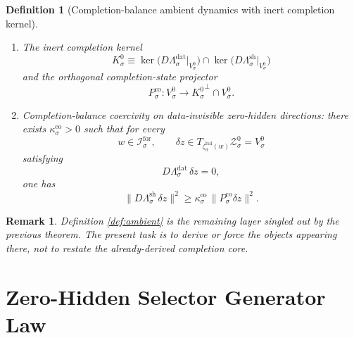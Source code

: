 \documentclass[11pt]{article}
\newcommand{\ForSpace}[1]{\mathcal I_{#1}^{\mathrm{for}}}
\newcommand{\BalBody}[1]{\mathcal B_{#1}^{\mathrm{bal}}}
\newcommand{\BalData}[1]{\Lambda_{#1}^{\mathrm{dat}}}
\newcommand{\BalShell}[1]{\Lambda_{#1}^{\mathrm{sh}}}
\newcommand{\ZeroHiddenSlice}[1]{\mathcal Z_{#1}^{0}}
\newcommand{\ZeroHiddenVec}[1]{V_{#1}^{0}}
\newcommand{\Kernel}[1]{K_{#1}^{0}}
\newcommand{\BalEmbed}[1]{\zeta_{#1}^{\mathrm{bal}}}
\newcommand{\StateComp}[1]{P_{#1}^{\mathrm{co}}}
\newtheorem{definition}{Definition}
\newtheorem{remark}{Remark}
\begin{document}
\begin{definition}[Completion-balance ambient dynamics with inert completion kernel]
\begin{enumerate}
\begin{equation}
    \BalBody{\sigma}\cap\ZeroHiddenSlice{\sigma}
    \bigr)
    =
    \BalData{\sigma}\Bigl(
    \BalBody{\sigma}\cap
    \ZeroHiddenSlice{\sigma}\cap
    \bigl(\BalShell{\sigma}\bigr)^{-1}(0)
    \Bigr).
    \label{eq:ambientsolvability}
    \end{equation}
    \item The inert completion kernel
    \[
    \Kernel{\sigma}
    \equiv
    \ker\bigl(D\BalData{\sigma}\big|_{\ZeroHiddenVec{\sigma}}\bigr)
    \cap
    \ker\bigl(D\BalShell{\sigma}\big|_{\ZeroHiddenVec{\sigma}}\bigr)
    \]
    and the orthogonal completion-state projector
    \[
    \StateComp{\sigma}:
    \ZeroHiddenVec{\sigma}\to
    {\Kernel{\sigma}}^{\perp}\cap\ZeroHiddenVec{\sigma}.
    \]
    \item Completion-balance coercivity on data-invisible zero-hidden directions: there exists \(\kappa_{\sigma}^{\mathrm{co}}>0\) such that for every
    \[
    w\in\ForSpace{\sigma},
    \qquad
    \delta z\in T_{\BalEmbed{\sigma}(w)}\ZeroHiddenSlice{\sigma}=\ZeroHiddenVec{\sigma}
    \]
    satisfying
    \[
    D\BalData{\sigma}\,\delta z=0,
    \]
    one has
    \begin{equation}
    \|D\BalShell{\sigma}\,\delta z\|^{2}
    \ge
    \kappa_{\sigma}^{\mathrm{co}}\,
    \|\StateComp{\sigma}\delta z\|^{2}.
    \label{eq:ambientcoercive}
    \end{equation}
\end{enumerate}
\end{definition}

\begin{remark}
Definition \ref{def:ambient} is the remaining layer singled out by the previous theorem. The present task is to derive or force the objects appearing there, not to restate the already-derived completion core.
\end{remark}

\section{Zero-Hidden Selector Generator Law}
\end{document}
